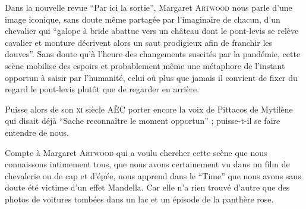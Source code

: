\begin{prose}
Dans la nouvelle revue \enquote{Par ici la sortie}, Margaret \textsc{Artwood} nous parle d’une image iconique, sans doute même partagée par l’imaginaire de chacun, d’un chevalier qui \enquote{galope à bride abattue vers un château dont le pont-levis se relève \textelp{} cavalier et monture décrivent alors un saut prodigieux afin de franchir les douves}. Sans doute qu’à l’heure des changements suscités par la pandémie, cette scène mobilise des espoirs et probablement même une métaphore de l’instant opportun à saisir par l’humanité, celui où plus que jamais il convient de fixer du regard le pont-levis plutôt que de regarder en arrière.

Puisse alors de son \textsc{xi}\ieme{} siècle AÈC porter encore la voix de Pittacos de Mytilène qui disait déjà \enquote{Sache reconnaître le moment opportun} ; puisse-t-il se faire entendre de nous.

Compte à Margaret \textsc{Artwood} qui a voulu chercher cette scène que nous connaissons intimement tous, que nous avons certainement vu dans un film de chevalerie ou de cap et d’épée, nous apprend dans le \enquote{Time} que nous avons sans doute été victime d’un effet Mandella. Car elle n’a rien trouvé d’autre que des photos de voitures tombées dans un lac et un épisode de la panthère rose.
\end{prose}
